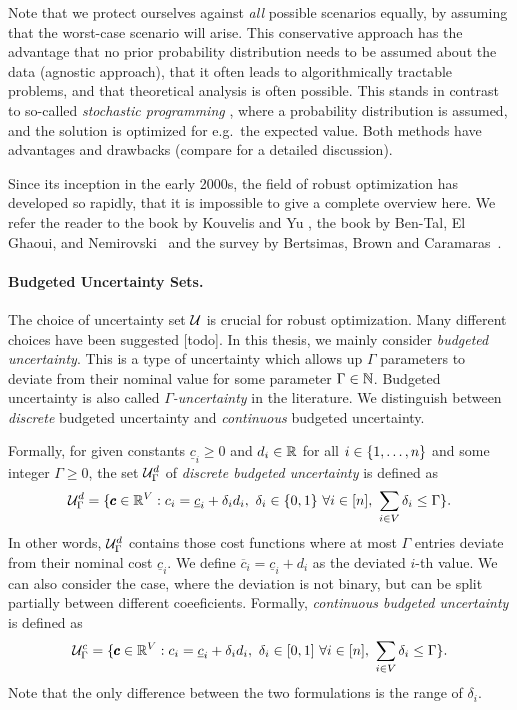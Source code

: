 Note that we protect ourselves against \emph{all} possible scenarios equally, by assuming that the worst-case scenario will arise. This conservative approach has the advantage that no prior probability distribution needs to be assumed about the data (agnostic approach), that it often leads to algorithmically tractable problems, and that theoretical analysis is often possible. This stands in contrast to so-called \emph{stochastic programming} \cite{birge2011introduction}, where a probability distribution is assumed, and the solution is optimized for e.g.\ the expected value. Both methods have advantages and drawbacks (compare \cite{ben2009robust} for a detailed discussion).  
 
Since its inception in the early 2000s, the field of robust optimization has developed so rapidly, that it is impossible to give a complete overview here. We refer the reader to the book by Kouvelis and Yu \cite{kouvelis2013robust}, the book by Ben-Tal, El Ghaoui, and Nemirovski~\cite{ben2009robust} and the survey by Bertsimas, Brown and Caramaras~\cite{bertsimas2011theory}. 

\paragraph*{Budgeted Uncertainty Sets.}
The choice of uncertainty set $\mathcal{U}$ is crucial for robust optimization. Many different choices have been suggested [todo]. In this thesis, we mainly consider \emph{budgeted uncertainty}. This is a type of uncertainty which allows up $\Gamma$ parameters to deviate from their nominal value for some parameter $\Gamma \in \mathbb{N}$. Budgeted uncertainty is also called \emph{$\Gamma$-uncertainty} in the literature. We distinguish between \emph{discrete} budgeted uncertainty and \emph{continuous} budgeted uncertainty.

Formally, for given constants $\underline{c}_i \geq 0$ and $d_i \in \mathbb{R}$ for all $i \in \{ 1, \ldots, n \}$ and some integer $\Gamma \geq 0$, the set $\mathcal{U}^d_\Gamma$ of \emph{discrete budgeted uncertainty} is defined as
\[
\mathcal{U}^d_\Gamma = \{  \pmb c \in \mathbb{R}^V : c_i = \underline{c}_i + \delta_id_i,\  \delta_i \in \{ 0,1 \}\ \forall i \in [n],\ \sum_{i \in V}\delta_i \leq \Gamma  \}.
\]
In other words, $\mathcal{U}^d_\Gamma$ contains those cost functions where at most $\Gamma$ entries deviate from their nominal cost $\underline{c}_i$. We define $\overline{c}_i = \underline{c}_i + d_i$ as the deviated $i$-th value. We can also consider the case, where the deviation is not binary, but can be split partially between different coeeficients. Formally, \emph{continuous budgeted uncertainty} is defined as
\[
\cU^c_\Gamma = \set{ \pmb c \in \R^V : c_i = \underline{c}_i + \delta_id_i,\  \delta_i \in [0,1]\ \forall i \in [n],\ \sum_{i \in V}\delta_i \leq \Gamma }.
\]
Note that the only difference between the two formulations is the range of $\delta_i$.

